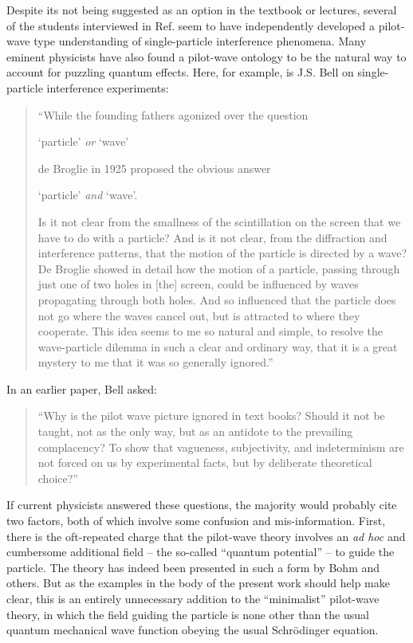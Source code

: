 \documentclass[aps,prc,twocolumn,letterpaper,floatfix]{revtex4}
\begin{document}
Despite its not being suggested as an option in the textbook or
lectures, several of the students interviewed in
Ref.  seem to have independently developed a
pilot-wave type understanding of single-particle interference
phenomena.  Many eminent physicists have also found a pilot-wave
ontology to be the natural way to account for puzzling quantum
effects.  Here, for example, is J.S. Bell on 
single-particle interference experiments:
\begin{quote}
``While the founding fathers agonized over the question 
\begin{center}
`particle' \emph{or} `wave' 
\end{center}
de Broglie in 1925 proposed the obvious answer
\begin{center}
`particle' \emph{and} `wave'.
\end{center}
Is it not clear from the smallness of the scintillation on the screen
that we have to do with a particle?  And is it not clear, from the
diffraction and interference patterns, that the motion of the particle
is directed by a wave?  De Broglie showed in detail how the motion of
a particle, passing through just one of two holes in [the] screen,
could be influenced by waves propagating through both holes.  And so
influenced that the particle does not go where the waves cancel out,
but is attracted to where they cooperate.  This idea seems to me so
natural and simple, to resolve the wave-particle dilemma in such a
clear and ordinary way, that it is a great mystery to me that it was
so generally ignored.'' \cite{bell6}
\end{quote}
In an earlier paper, Bell asked:
\begin{quote}
``Why is the pilot
wave picture ignored in text books? Should it not be taught, not as
the only way, but as an antidote to the prevailing complacency? To 
show that vagueness, subjectivity, and indeterminism are not forced 
on us by experimental facts, but by deliberate theoretical 
choice?'' \cite{bellwhy}
\end{quote}
If current physicists answered these questions, the majority would probably
cite two factors, both of which involve some confusion and
mis-information.  First, there is the oft-repeated charge that the
pilot-wave theory involves an \emph{ad hoc} and cumbersome additional
field -- the so-called ``quantum potential'' -- to guide the
particle.  The theory has indeed been presented in such a form by Bohm
and others. \cite{uu,holland}  But as the examples in the body of the
present work should help make clear, this is an entirely unnecessary
addition to the ``minimalist'' pilot-wave theory, in which the field
guiding the particle is none other than the usual quantum mechanical
wave function obeying the usual Schr\"odinger equation.  
\end{document}
